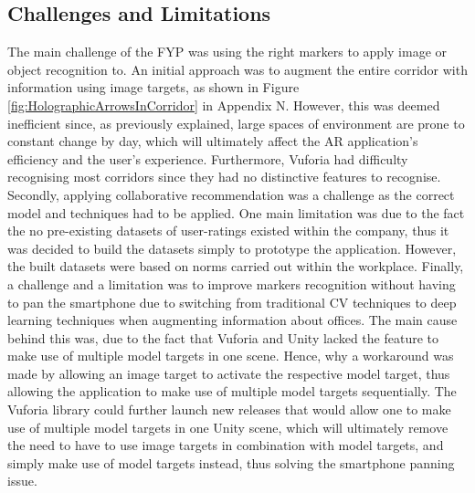 \documentclass{aifyp}
\begin{document}
\subsection{Challenges and Limitations}
\indent The main challenge of the FYP was using the right markers to apply image or object recognition to. An initial approach was to augment the entire corridor with information using image targets, as shown in Figure  \ref{fig:HolographicArrowsInCorridor} in Appendix N. However, this was deemed inefficient since, as previously explained, large spaces of environment are prone to constant change by day, which will ultimately affect the AR application’s efficiency and the user’s experience. Furthermore, Vuforia had difficulty recognising most corridors since they had no distinctive features to recognise.
\newline
\newline
\indent Secondly, applying collaborative recommendation was a challenge as the correct model and techniques had to be applied. One main limitation was due to the fact the no pre-existing datasets of user-ratings existed within the company, thus it was decided to build the datasets simply to prototype the application. However, the built datasets were based on norms carried out within the workplace.
\newline
\newline
\indent Finally, a challenge and  a limitation was to improve markers recognition without having to pan the smartphone due to switching from traditional CV techniques to deep learning techniques when augmenting information about offices. The main cause behind this was, due to the fact that Vuforia and Unity lacked the feature to make use of multiple model targets in one scene. Hence, why a workaround was made by allowing an image target to activate the respective model target, thus allowing the application to make use of multiple model targets sequentially. The Vuforia library could further launch new releases that would allow one to make use of multiple model targets in one Unity scene, which will ultimately remove the need to have to use image targets in combination with model targets, and simply make use of model targets instead, thus solving the smartphone panning issue.
\end{document}
